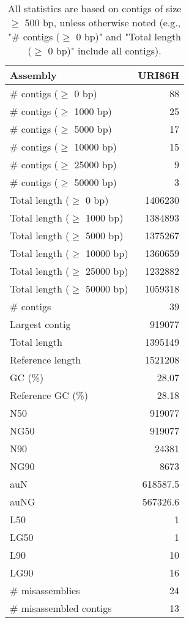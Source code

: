 \documentclass[12pt,a4paper]{article}
\begin{document}
\begin{table}[ht]
\begin{center}
\caption{All statistics are based on contigs of size $\geq$ 500 bp, unless otherwise noted (e.g., "\# contigs ($\geq$ 0 bp)" and "Total length ($\geq$ 0 bp)" include all contigs).}
\begin{tabular}{|l*{1}{|r}|}
\hline
Assembly & URI86H \\ \hline
\# contigs ($\geq$ 0 bp) & 88 \\ \hline
\# contigs ($\geq$ 1000 bp) & 25 \\ \hline
\# contigs ($\geq$ 5000 bp) & 17 \\ \hline
\# contigs ($\geq$ 10000 bp) & 15 \\ \hline
\# contigs ($\geq$ 25000 bp) & 9 \\ \hline
\# contigs ($\geq$ 50000 bp) & 3 \\ \hline
Total length ($\geq$ 0 bp) & 1406230 \\ \hline
Total length ($\geq$ 1000 bp) & 1384893 \\ \hline
Total length ($\geq$ 5000 bp) & 1375267 \\ \hline
Total length ($\geq$ 10000 bp) & 1360659 \\ \hline
Total length ($\geq$ 25000 bp) & 1232882 \\ \hline
Total length ($\geq$ 50000 bp) & 1059318 \\ \hline
\# contigs & 39 \\ \hline
Largest contig & 919077 \\ \hline
Total length & 1395149 \\ \hline
Reference length & 1521208 \\ \hline
GC (\%) & 28.07 \\ \hline
Reference GC (\%) & 28.18 \\ \hline
N50 & 919077 \\ \hline
NG50 & 919077 \\ \hline
N90 & 24381 \\ \hline
NG90 & 8673 \\ \hline
auN & 618587.5 \\ \hline
auNG & 567326.6 \\ \hline
L50 & 1 \\ \hline
LG50 & 1 \\ \hline
L90 & 10 \\ \hline
LG90 & 16 \\ \hline
\# misassemblies & 24 \\ \hline
\# misassembled contigs & 13 \\ \hline

\end{tabular}
\end{center}
\end{table}
\end{document}
